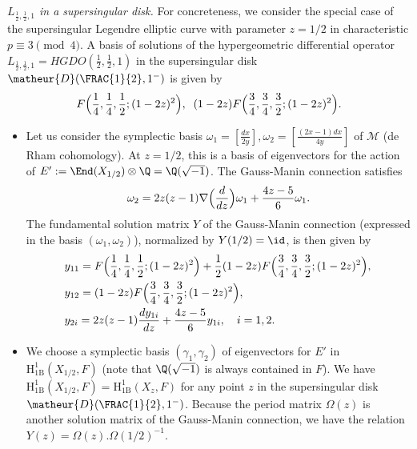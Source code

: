 \begin{para}\label{para-supersingular-disk}
 {\it $L_{\frac{1}{2},\frac{1}{2},1}$ in a supersingular disk.} For
 concreteness, we consider the special case of the supersingular
 Legendre elliptic curve with parameter $z = 1/2$ in characteristic
 $p\equiv 3\pmod{4}$. A basis of solutions of the hypergeometric
 differential operator 
 $L_{\frac{1}{2},\frac{1}{2},1}= HGDO(\frac{1}{2},\frac{1}{2},1)$ in the
 supersingular disk $\matheur{D}(\FRAC{1}{2}, 1^-)$ is given by
 \begin{equation*}
 F\Bigl(\frac{1}{4},\frac{1}{4},\frac{1}{2};(1-2z)^2\Bigr),\;\;
 (1-2z)F\Bigl(\frac{3}{4},\frac{3}{4},\frac{3}{2};(1-2z)^2\Bigr).
 \end{equation*}

\begin{itemize}
 \item Let us consider the symplectic basis
       $\omega_1=[\frac{dx}{2y}],\omega_2=[\frac{(2x-1)dx}{4y}]$ of
       $\mathcal{M}$ (de Rham cohomology). At $z=1/2$, this is a basis of
       eigenvectors for the action of $E':=\End(X_{1/2}) \otimes {\Q}
       ={\Q}(\sqrt{-1})$. The Gauss-Manin connection satisfies
       \begin{equation*}
	\omega_2=2z(z-1)\nabla\Bigl(\frac{d}{dz}\Bigr)\omega_1
	 + \frac{4z-5}{6}\omega_1.
       \end{equation*}
       The fundamental solution matrix $Y$ of
       the Gauss-Manin connection (expressed in the basis
       $(\omega_1,\omega_2)$), normalized by $Y(1/2)=\id$, is then given by
       \begin{align*}
	& y_{11} =
	F\Bigl(\frac{1}{4},\frac{1}{4},\frac{1}{2};(1-2z)^2\Bigr) +
	\frac{1}{2}(1-2z)F\Bigl(\frac{3}{4},\frac{3}{4},\frac{3}{2};
	(1-2z)^2\Bigr),\\
	& y_{12} = (1-2z)F\Bigl(\frac{3}{4},\frac{3}{4},\frac{3}{2};
	(1-2z)^2\Bigr),\\
	& y_{2i} = 2z(z-1) \frac{dy_{1i}}{dz}+\frac{4z-5}{6} y_{1i},
	\quad i=1,2.
       \end{align*}

 \item We choose a symplectic basis $(\gamma_1,\gamma_2)$ of
       eigenvectors for $E'$ in $\mathrm{H}^1_{1\mathrm{B}}(X_{1/2},F)$
       (note that ${\Q}(\sqrt{-1})$ is always contained in $F$). We have
       $\mathrm{H}^1_{1\mathrm{B}}(X_{1/2},F) =
       \mathrm{H}^1_{1\mathrm{B}}(X_z,F)$ for any point $z$ in the
       supersingular disk $\matheur{D}(\FRAC{1}{2}, 1^-)$.
       Because the period matrix $\Omega(z)$ is another solution matrix
       of the Gauss-Manin connection, we have the relation
       $Y(z)=\Omega(z).\Omega(1/2)^{-1}$.
       

\end{itemize}
\end{para}
